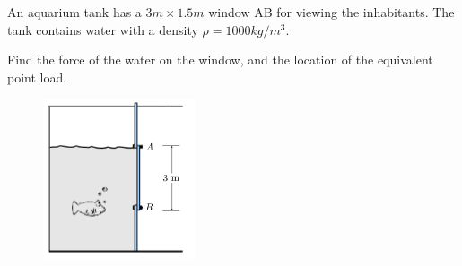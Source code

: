 
\noindent An aquarium tank has a $ 3 m \times 1.5 m$ window AB for viewing the inhabitants.  The tank contains water with a density $\rho = 1000 kg/m^3$.

\noindent Find the force of the water on the window, and the location of the equivalent point load.

\begin{figure}[ht!]
  \centering
  \includegraphics[width=0.4\textwidth,height=0.5\textheight,keepaspectratio]{fig-qz.png}
\end{figure}



